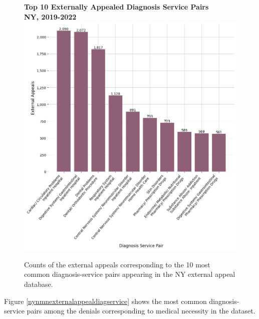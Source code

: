 \documentclass[12pt, a4paper,twoside,parskip=full]{report}
\theoremstyle{plain} %
\theoremstyle{definition} %
\theoremstyle{remark} %
\numberwithin{equation}{chapter}
\begin{document}
		\begin{figure}[h!]
			\centering
			\textbf{Top 10 Externally Appealed Diagnosis Service Pairs}\\
			\textbf{NY, 2019-2022}\\
			\includegraphics[width=.8\textwidth]{images/nys_external/top_externally_appealed_diag_treatments.png}
			\caption{Counts of the external appeals corresponding to the 10 most common diagnosis-service pairs appearing in the NY external appeal database.}
			\label{nyexternalappealsbydiagservice}
		\end{figure}
	\clearpage
	
		Figure \ref{nynmnexternalappealdiagservice} shows the most common diagnosis-service pairs among the denials corresponding to medical necessity in the dataset.
\end{document}
